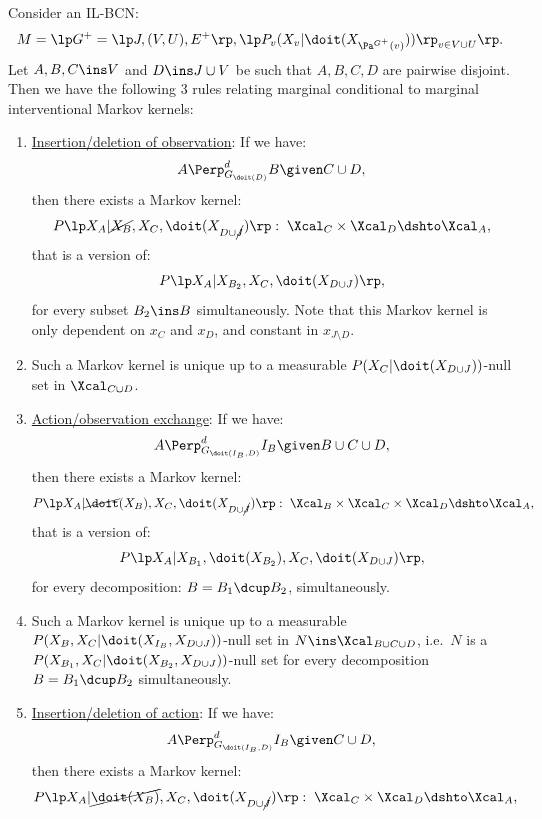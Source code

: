 \begin{Cor}[Do-calculus]\label{cor:do-calculus}
    Consider an IL-BCN:
    \[M= \lp G^+=\lp J,(V,U),E^+ \rp, \lp P_v ( X_v|\doit( X_{\Pa^{G^+}(v)})) \rp_{v \in V \cup U} \rp.\]
    Let $A,B,C \ins V$ and $D \ins J \cup V$ be such that $A,B,C,D$ are pairwise disjoint.\\
    Then we have the following 3 rules relating marginal conditional to marginal interventional Markov kernels:
    \begin{enumerate}
        \item \underline{Insertion/deletion of observation}: If we have:
            \[ A \Perp^d_{G_{\doit(D)}} B \given C \cup D,   \]
            then there exists a Markov kernel:
            \[ P\lp X_A|\cancel{X_B},X_C,\doit(X_{D\cup \cancel{J}})\rp:\;  \Xcal_C \times \Xcal_{D} \dshto \Xcal_A, \]
            that is a version of:
            \[P\lp X_A|X_{B_2},X_C,\doit(X_{D\cup J})\rp,\] 
            for every subset $B_2 \ins B$ simultaneously.
            Note that this Markov kernel is only dependent on $x_C$ and $x_D$, and constant in $x_{J\setminus D}$.
        \item[] Such a Markov kernel is unique up to a measurable $P(X_C|\doit(X_{D\cup J}))$-null set in $\Xcal_{C\cup D}$. 
         \item \underline{Action/observation exchange}: If we have:
            \[ A \Perp^d_{G_{\doit(I_B,D)}} I_B \given B \cup C \cup D,   \]
            then there exists a Markov kernel:
            \[P\lp X_A|\cancel{\doit}(X_B),X_C,\doit(X_{D\cup \cancel{J}})\rp: \;\Xcal_B \times \Xcal_C \times \Xcal_{D} \dshto \Xcal_A,\]
            that is a version of:            
            \[ P\lp X_A|X_{B_1},\doit(X_{B_2}),X_C,\doit(X_{D\cup J})\rp, \]
            for every decomposition: $B=B_1\dcup B_2$, simultaneously.
        \item[] Such a Markov kernel is unique up to a measurable $P(X_B,X_C|\doit(X_{I_B},X_{D\cup J}))$-null set in $N \ins \Xcal_{B \cup C\cup D}$, i.e.\ $N$ is a $P(X_{B_1},X_C|\doit(X_{B_2},X_{D\cup J}))$-null set
            for every decomposition $B=B_1\dcup B_2$ simultaneously.
        \item \underline{Insertion/deletion of action}: If we have:
            \[ A \Perp^d_{G_{\doit(I_B,D)}} I_B \given C  \cup D,   \]
            then there exists a Markov kernel: 
            \[P\lp X_A|\cancel{\doit(X_B)},X_C,\doit(X_{D\cup \cancel{J}})\rp:\; \Xcal_C \times \Xcal_{D} \dshto \Xcal_A,\] 

\end{enumerate}
\end{Cor}
